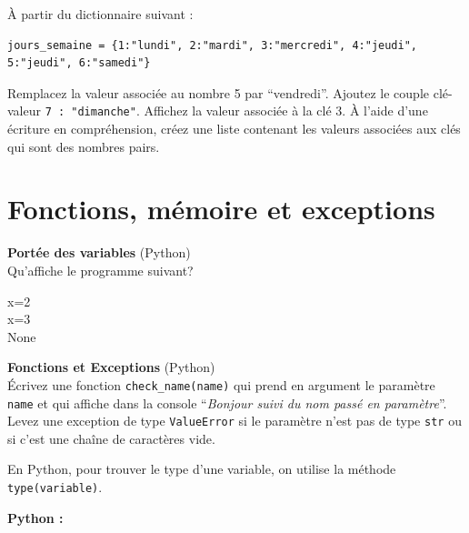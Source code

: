 \begin{Exercice}[5 minutes]
    À partir du dictionnaire suivant :
    \begin{lstlisting}
jours_semaine = {1:"lundi", 2:"mardi", 3:"mercredi", 4:"jeudi", 5:"jeudi", 6:"samedi"} \end{lstlisting}

    Remplacez la valeur associée au nombre 5 par ``vendredi''. Ajoutez le couple clé-valeur \lstinline{7 : "dimanche"}. Affichez la valeur associée à la clé 3.
    À l'aide d'une écriture en compréhension, créez une liste contenant les valeurs associées aux clés qui sont des nombres pairs.

    \begin{solution}
        
    \end{solution}
\end{Exercice}


\section{Fonctions, mémoire et exceptions}
\begin{Exercice}[5 minutes] \textbf{Portée des variables} (Python)\\
    Qu'affiche le programme suivant? \\

    

    \begin{solution}
            x=2 \\
            x=3 \\
            None
    \end{solution}

    
 \end{Exercice}

 \begin{Exercice}[10 minutes]\textbf{Fonctions et Exceptions} (Python)\\
    Écrivez une fonction \lstinline{check_name(name)} qui prend en argument le paramètre \lstinline{name} et qui affiche dans la console ``\textit{Bonjour suivi du nom passé en paramètre}''.
    Levez une exception de type \lstinline{ValueError} si le paramètre n'est pas de type \lstinline{str} ou si c'est une chaîne de caractères vide.

    \begin{conseil}
        En Python, pour trouver le type d'une variable, on utilise la méthode \lstinline{type(variable)}.
    \end{conseil}
    
    \begin{solution}   
        \textbf{Python :}
        
    \end{solution}
    
    \end{Exercice}

